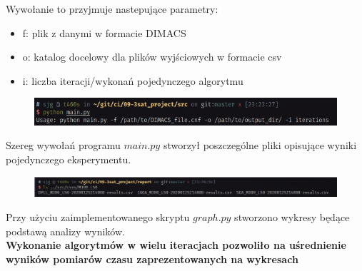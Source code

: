 \documentclass[10pt]{article}
\begin{document}
Wywołanie to przyjmuje nastepujące parametry:
\begin{itemize}
  \item f: plik z danymi w formacie DIMACS
  \item o: katalog docelowy dla plików wyjściowych w formacie csv
  \item i: liczba iteracji/wykonań pojedynczego algorytmu
\end{itemize}
\begin{figure}[h]
\centering
\includegraphics[scale=0.5]{img/help.png} \\
\end{figure}

Szereg wywołań programu $main.py$ stworzył poszczególne pliki opisujące wyniki pojedynczego eksperymentu.

\begin{figure}[h]
\centering
\includegraphics[scale=0.5]{img/csvdata.png} \\
\end{figure}

Przy użyciu zaimplementowanego skryptu $graph.py$ stworzono wykresy będące podstawą analizy wyników.\\
\textbf{Wykonanie algorytmów w wielu iteracjach pozwoliło na uśrednienie wyników pomiarów czasu zaprezentowanych na wykresach}
\pagebreak
\end{document}
